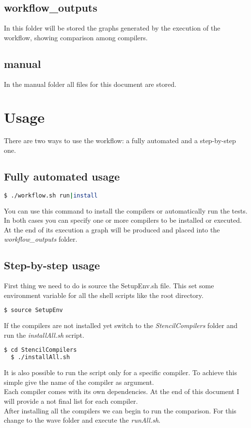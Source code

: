 \documentclass[AEJ]{AEA}
\begin{document}
\subsection{workflow\_outputs}
In this folder will be stored the graphs generated by the execution of the workflow, showing comparison among compilers.

\subsection{manual}
In the manual folder all files for this document are stored.

\section{Usage}
There are two ways to use the workflow: a fully automated and a step-by-step one.
\subsection{Fully automated usage}
\begin{lstlisting}[frame=single,language=bash]
  $ ./workflow.sh run|install
\end{lstlisting}

You can use this command to install the compilers or automatically run the tests. In both cases you can specify one or more compilers to be installed or executed. At the end of its execution a graph will be produced and placed into the  \emph{workflow\_outputs} folder.
\subsection{Step-by-step usage}
First thing we need to do is source the SetupEnv.sh file. This set some environment variable for all the shell scripts like the root directory.

\begin{lstlisting}[frame=single,language=bash]
  $ source SetupEnv
\end{lstlisting}

If the compilers are not installed yet switch to the \emph{StencilCompilers} folder and run the \emph{installAll.sh} script. 
\begin{lstlisting}[frame=single,language=bash]
  $ cd StencilCompilers
  $ ./installAll.sh 
\end{lstlisting}

It is also possible to run the script only for a specific compiler. To achieve this simple give the name of the compiler as argument.
\\
Each compiler comes with its own dependencies. At the end of this document I will provide a not final list for each compiler. 
\\
After installing all the compilers we can begin to run the comparison. For this change to the wave folder and execute the \emph{runAll.sh}.
\end{document}
